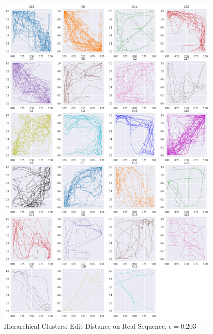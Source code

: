 \begin{figure}[h]
  \centering
  \includegraphics[width=\linewidth,height=\textheight,keepaspectratio]{figs/clusters/CLU_H_ALL[EDR;e=.203].png}
  \caption{ Hierarchical Clusters: Edit Distance on Real Sequence, $\epsilon=0.203$}
\end{figure}

